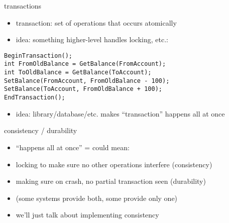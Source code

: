 \begin{frame}[fragile]{transactions}
    \begin{itemize}
    \item transaction: set of operations that occurs atomically
    \item idea: something higher-level handles locking, etc.:
   \end{itemize}
\begin{Verbatim}
BeginTransaction();
int FromOldBalance = GetBalance(FromAccount);
int ToOldBalance = GetBalance(ToAccount);
SetBalance(FromAccount, FromOldBalance - 100);
SetBalance(ToAccount, FromOldBalance + 100);
EndTransaction();
\end{Verbatim}
    \begin{itemize}
    \item idea: library/database/etc. makes ``transaction'' happens all at once
    \end{itemize}
\end{frame}

\begin{frame}{consistency / durability}
    \begin{itemize}
    \item ``happens all at once'' = could mean:
    \vspace{.5cm}
    \item locking to make sure no other operations interfere (consistency)
    \item making sure on crash, no partial transaction seen (durability)
    \vspace{.5cm}
    \item \small (some systems provide both, some provide only one)
    \item we'll just talk about implementing consistency
    \end{itemize}
\end{frame}
